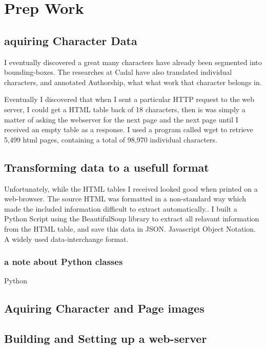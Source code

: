 \chapter{Prep Work}


\section{aquiring Character Data}

I eventually discovered a great many characters have already been segmented into bounding-boxes.  The researches at Cadal have also translated individual characters, and annotated Authorship, what what work that character belongs in.

Eventually I discovered that when I sent a particular HTTP request to the web server, I could get a HTML table back of 18 characters,  then is was simply a matter of asking the webserver for the next page and the next page until I received an empty table as a response.  I used a program called wget to retrieve 5,499 html pages, containing a total of 98,970 individual characters.

\section{Transforming data to a usefull format}

Unfortunately, while the HTML tables I received looked good when printed on a web-browser.  The source HTML was formatted in a non-standard way which made the included information difficult to extract automatically..  I built a Python Script using the BeautifulSoup library to extract all relavant information from the HTML table, and save this data in JSON.  Javascript Object Notation.  A widely used data-interchange format.

\subsection{a note about Python classes}

Python 



\section{Aquiring Character and Page images}


\section{Building and Setting up a web-server}

